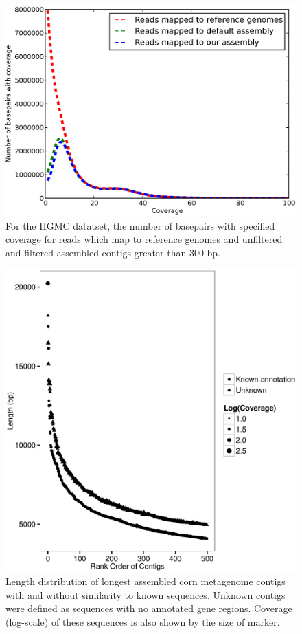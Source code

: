 \documentclass{pnastwo}
\begin{document}
\begin{figure}
\centerline{\includegraphics[width=.7\textwidth]{./figures/coverage.eps}}
\caption{For the HGMC datatset, the number of basepairs with specified coverage for reads which
  map to reference genomes and unfiltered and filtered assembled
  contigs greater than 300 bp.}
\label{coveragehmp}
\end{figure}






\begin{figure}
\begin{center}
\centerline{\includegraphics[width=.7\textwidth]{./figures/corn-cov-len-500.eps}}
\caption{Length distribution of longest assembled corn metagenome contigs with and without similarity to known sequences.  Unknown contigs were defined as sequences with no annotated gene regions.  Coverage (log-scale) of these sequences is also shown by the size of marker. }
\label{cornlength}
\end{center}
\end{figure}
\end{document}
